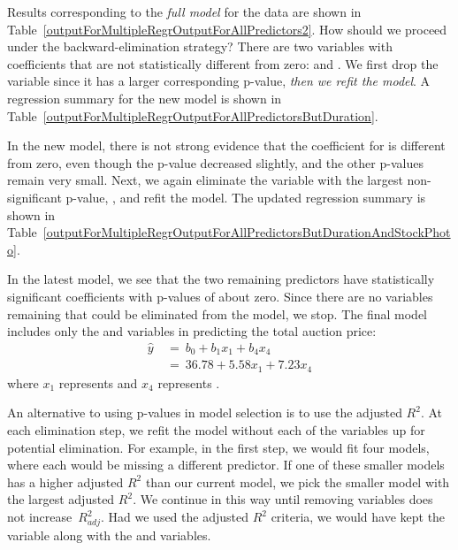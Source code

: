 \begin{example}{Results corresponding to the \emph{full model} for the  data are shown in Table~\ref{outputForMultipleRegrOutputForAllPredictors2}. How should we proceed under the backward-elimination strategy?} \label{backwardEliminationExampleWMarioKartData}
There are two variables with coefficients that are not statistically different from zero:  and . We first drop the  variable since it has a larger corresponding p-value, \emph{then we refit the model}. A regression summary for the new model is shown in Table~\ref{outputForMultipleRegrOutputForAllPredictorsButDuration}.

In the new model, there is not strong evidence that the coefficient for  is different from zero, even though the p-value decreased slightly, and the other p-values remain very small. Next, we again eliminate the variable with the largest non-significant p-value, , and refit the model. The updated regression summary is shown in Table~\ref{outputForMultipleRegrOutputForAllPredictorsButDurationAndStockPhoto}.

In the latest model, we see that the two remaining predictors have statistically significant coefficients with p-values of about zero. Since there are no variables remaining that could be eliminated from the model, we stop. The final model includes only the  and  variables in predicting the total auction price:
\begin{align*}
\hat{y} \ &= \ b_0 + b_1x_1 + b_4x_4 \\
	&= \ 36.78 + 5.58x_1 + 7.23x_4
\end{align*}
where $x_1$ represents  and $x_4$ represents .

An alternative to using p-values in model selection is to use the adjusted $R^2$. At each elimination step, we refit the model without each of the variables up for potential elimination. For example, in the first step, we would fit four models, where each would be missing a different predictor. If one of these smaller models has a higher adjusted $R^2$ than our current model, we pick the smaller model with the largest adjusted $R^2$. We continue in this way until removing variables does not increase~$R_{adj}^2$. Had we used the adjusted $R^2$ criteria, we would have kept the  variable along with the  and  variables.
\end{example}

